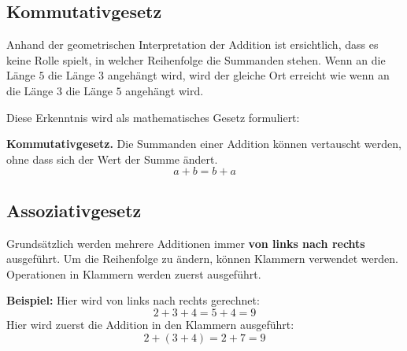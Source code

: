 \subsection{Kommutativgesetz}

Anhand der geometrischen Interpretation der Addition ist ersichtlich, dass es keine Rolle spielt, in welcher Reihenfolge die Summanden stehen. Wenn an die Länge $5$ die Länge $3$ angehängt wird, wird der gleiche Ort erreicht wie wenn an die Länge $3$ die Länge $5$ angehängt wird.
\begin{center}
\end{center}
Diese Erkenntnis wird als mathematisches Gesetz formuliert:
\begin{theorem}
  \textbf{Kommutativgesetz.} Die Summanden einer Addition können vertauscht werden, ohne dass sich der Wert der Summe ändert.
  \[
    a + b = b + a
  \]
\end{theorem}

\subsection{Assoziativgesetz}

Grundsätzlich werden mehrere Additionen immer \textbf{von links nach rechts} ausgeführt. Um die Reihenfolge zu ändern, können Klammern verwendet werden. Operationen in Klammern werden zuerst ausgeführt.
\begin{example}
  \textbf{Beispiel:} Hier wird von links nach rechts gerechnet:
  \[
    2 + 3 + 4 = 5 + 4 = 9
  \]
  Hier wird zuerst die Addition in den Klammern ausgeführt:
  \[
    2 + (3 + 4) = 2 + 7 = 9
  \]
\end{example}

